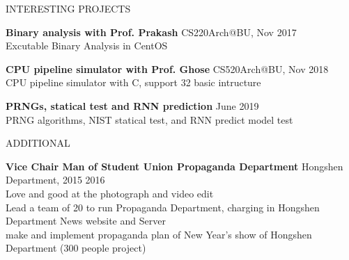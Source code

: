 \documentclass{article}
\begin{document}
\vskip 0.1in
\noindent
INTERESTING PROJECTS
\hrulefill

\noindent
\textbf{Binary analysis with Prof. Prakash }
\dotfill CS220Arch@BU, Nov 2017 \\
    \indent Excutable Binary Analysis in CentOS

\noindent
\textbf{CPU pipeline simulator with Prof. Ghose}
\dotfill CS520Arch@BU, Nov 2018 \\
    \indent CPU pipeline simulator with C, support 32 basic intructure

\noindent
\textbf{PRNGs, statical test and RNN prediction}
\dotfill June 2019 \\
    \indent PRNG algorithms, NIST statical test, and RNN predict model test

\vskip 0.1in
\noindent
ADDITIONAL
\hrulefill

\noindent
\textbf{Vice Chair Man of Student Union Propaganda Department}
\dotfill Hongshen Department, 2015  2016 \\
    \indent Love and good at the photograph and video edit \\
    \indent Lead a team of 20 to run Propaganda Department, charging in Hongshen Department News website and Server \\
    \indent make and implement propaganda plan of New Year's show of Hongshen Department (300 people project)

\end{document}
